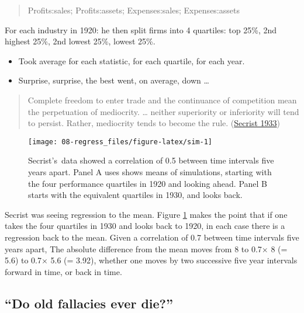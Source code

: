 \documentclass[
  10ptls,
  b5paper]{book}
\providecommand{\tightlist}{%
  \setlength{\itemsep}{0pt}\setlength{\parskip}{0pt}}
\begin{document}
\begin{quote}
Profits:sales; Profits:assets; Expenses:sales; Expenses:assets
\end{quote}

For each industry in 1920: he then split firms into 4 quartiles: top 25\%, 2nd highest 25\%, 2nd lowest 25\%, lowest 25\%.

\begin{itemize}
\tightlist
\item
  Took average for each statistic, for each quartile, for each year.
\item
  Surprise, surprise, the best went, on average, down \ldots{}
\end{itemize}

\begin{quote}
Complete freedom to enter trade and the continuance of competition mean the perpetuation of mediocrity. \ldots{} neither superiority or inferiority will tend to persist. Rather, mediocrity tends to become the rule. (\protect\hyperlink{ref-secrist1933triumph}{Secrist 1933})
\end{quote}

\begin{figure}[H]

{\centering \texttt{[image: 08-regress\_files/figure-latex/sim-1]} 

}

\caption{Secrist's data showed a correlation of 0.5 between
time intervals five years apart.  Panel A uses shows means of simulations,
starting with the four performance quartiles in 1920 and looking ahead.
Panel B starts with the equivalent quartiles in 1930, and looks back.}\label{fig:sim}
\end{figure}

Secrist was seeing regression to the mean. Figure \ref{fig:sim} makes the point that if one takes the four quartiles in 1930 and looks back to 1920, in each case there is a regression back to the mean. Given a correlation of 0.7 between time intervals five years apart, The absolute difference from the mean moves from 8 to 0.7\(\times\) 8 (= 5.6) to 0.7\(\times\) 5.6 (= 3.92), whether one moves by two successive five year intervals forward in time, or back in time.

\hypertarget{do-old-fallacies-ever-die}{%
\subsection*{``Do old fallacies ever die?''}\label{do-old-fallacies-ever-die}}
\end{document}
